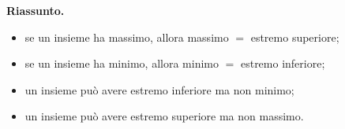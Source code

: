 \documentclass[11pt,a4paper]{article}
\theoremstyle{definition}
\begin{document}
\textbf{Riassunto.}
\begin{itemize}
    \item se un insieme ha massimo, allora massimo $=$ estremo superiore;
    \item se un insieme ha minimo, allora minimo $=$ estremo inferiore;
    \item un insieme può avere estremo inferiore ma non minimo;
    \item un insieme può avere estremo superiore ma non massimo.
\end{itemize}
\end{document}
